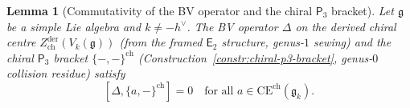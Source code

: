 \documentclass[11pt,reqno]{amsart}
\newtheorem{lemma}[theorem]{Lemma}
\theoremstyle{definition}
\theoremstyle{remark}
\newcommand{\CE}{\mathrm{CE}}
\newcommand{\Etwo}{\mathsf{E}_{2}}
\newcommand{\Pthree}{\mathsf{P}_{3}}
\newcommand{\fg}{\mathfrak{g}}
\numberwithin{equation}{section}
\begin{document}
\begin{lemma}[Commutativity of the BV operator and the
chiral $\Pthree$ bracket]
\label{lem:bv-p3-commutativity}
Let $\fg$ be a simple Lie algebra and $k \neq -h^\vee$.
The BV operator $\Delta$ on the derived chiral centre
$Z^{\mathrm{der}}_{\mathrm{ch}}(V_k(\fg))$
\textup{(}from the framed $\Etwo$ structure,
genus-$1$ sewing\textup{)} and the chiral $\Pthree$
bracket $\{-,-\}^{\mathrm{ch}}$
\textup{(}Construction~\textup{\ref{constr:chiral-p3-bracket}},
genus-$0$ collision residue\textup{)} satisfy
\begin{equation}\label{eq:bv-p3-commute}
  [\Delta, \{a,-\}^{\mathrm{ch}}] = 0
  \quad \text{for all } a \in \CE^{\mathrm{ch}}(\fg_k).
\end{equation}
\end{lemma}
\end{document}
